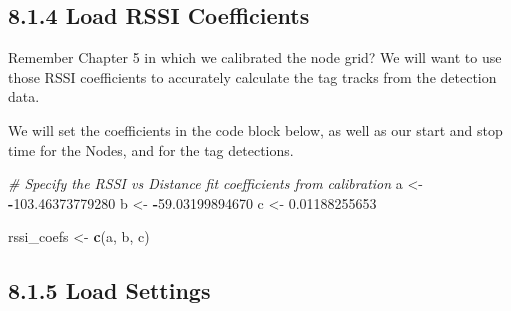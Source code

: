 \documentclass[
]{book}
\newenvironment{Shaded}{\begin{snugshade}}{\end{snugshade}}
\newcommand{\CommentTok}[1]{\textcolor[rgb]{0.56,0.35,0.01}{\textit{#1}}}
\newcommand{\FloatTok}[1]{\textcolor[rgb]{0.00,0.00,0.81}{#1}}
\newcommand{\FunctionTok}[1]{\textcolor[rgb]{0.13,0.29,0.53}{\textbf{#1}}}
\newcommand{\NormalTok}[1]{#1}
\newcommand{\OtherTok}[1]{\textcolor[rgb]{0.56,0.35,0.01}{#1}}
\newcommand{\SpecialCharTok}[1]{\textcolor[rgb]{0.81,0.36,0.00}{\textbf{#1}}}
\begin{document}
\subsection{8.1.4 Load RSSI Coefficients}\label{load-rssi-coefficients}

Remember Chapter 5 in which we calibrated the node grid? We will want to use those RSSI coefficients to accurately calculate the tag tracks from the detection data.

We will set the coefficients in the code block below, as well as our start and stop time for the Nodes, and for the tag detections.

\begin{Shaded}
\begin{Highlighting}[]
\CommentTok{\# Specify the RSSI vs Distance fit coefficients from calibration}
\NormalTok{a }\OtherTok{\textless{}{-}} \SpecialCharTok{{-}}\FloatTok{103.46373779280}
\NormalTok{b }\OtherTok{\textless{}{-}} \SpecialCharTok{{-}}\FloatTok{59.03199894670}
\NormalTok{c }\OtherTok{\textless{}{-}} \FloatTok{0.01188255653}

\NormalTok{rssi\_coefs }\OtherTok{\textless{}{-}} \FunctionTok{c}\NormalTok{(a, b, c)}
\end{Highlighting}
\end{Shaded}

\subsection{8.1.5 Load Settings}\label{load-settings-2}
\end{document}
